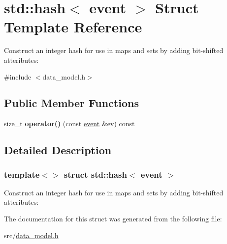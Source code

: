 \hypertarget{structstd_1_1hash_3_01event_01_4}{}\section{std\+:\+:hash$<$ event $>$ Struct Template Reference}
\label{structstd_1_1hash_3_01event_01_4}


Construct an integer hash for use in maps and sets by adding bit-\/shifted atteributes\+:  




{\ttfamily \#include $<$data\+\_\+model.\+h$>$}

\subsection*{Public Member Functions}
\begin{DoxyCompactItemize}
\item 
\mbox{\label{structstd_1_1hash_3_01event_01_4_a884f1c6eb055d6f5343f765881e5e766}} 
size\+\_\+t {\bfseries operator()} (const \hyperlink{structtricl_1_1event}{event} \&ev) const
\end{DoxyCompactItemize}


\subsection{Detailed Description}
\subsubsection*{template$<$$>$\newline
struct std\+::hash$<$ event $>$}

Construct an integer hash for use in maps and sets by adding bit-\/shifted atteributes\+: 

The documentation for this struct was generated from the following file\+:\begin{DoxyCompactItemize}
\item 
src/\hyperlink{data__model_8h}{data\+\_\+model.\+h}\end{DoxyCompactItemize}
